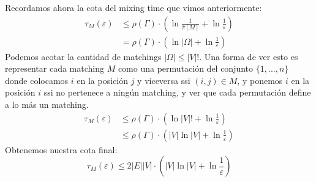 \documentclass{article}
\newcommand{\eps}{\varepsilon}
\begin{document}
	Recordamos ahora la cota del mixing time que vimos anteriormente:
	\begin{align*}
	\tau_M(\eps) &\leq \rho(\Gamma)\cdot\left(\ln \frac{1}{\bar{\pi}[M]} + \ln \frac{1}{\eps}\right)\\
	&= \rho(\Gamma)\cdot\left(\ln |\Omega| + \ln \frac{1}{\eps}\right)
	\end{align*}
	Podemos acotar la cantidad de matchings $|\Omega| \leq |V|!$. Una forma de ver esto es representar cada matching $M$ como una permutación del conjunto $\{1,...,n\}$ donde colocamos $i$ en la posición $j$ y viceversa ssi $(i,j)\in M$, y ponemos $i$ en la posición $i$ ssi no pertenece a ningún matching, y ver que cada permutación define a lo más un matching. 
	\begin{align*}
		\tau_M(\eps) &\leq \rho(\Gamma)\cdot\left(\ln |V|! + \ln \frac{1}{\eps}\right)\\
		&\leq \rho(\Gamma)\cdot\left(|V|\ln |V| + \ln \frac{1}{\eps}\right)
	\end{align*}
	Obtenemos nuestra cota final:
	$$
	\tau_M(\eps) \leq 2|E||V|\cdot\left(|V|\ln |V| + \ln \frac{1}{\eps}\right)
	$$
	
\end{document}
